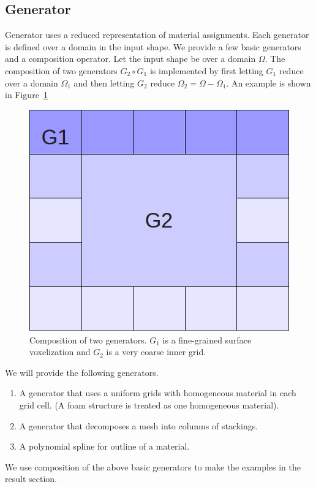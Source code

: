 \documentclass[annual]{acmsiggraph}
\begin{document}
\subsection{Generator}
Generator uses a reduced representation
of material assignments.
Each generator is defined over a domain in the input shape.
We provide a few basic generators and a composition operator.
Let the input shape be over a domain $\Omega$.
The composition of two generators $G_2\circ G_1$ is implemented by
first letting $G_1$ reduce over a domain $\Omega_1$ and
then letting $G_2$ reduce $\Omega_2 = \Omega-\Omega_1$.
An example is shown in Figure~\ref{fig:genCompose}
\begin{figure}[h]
\includegraphics[scale=0.2]{figure/genCompose.png}
\caption{Composition of two generators. $G_1$ is a fine-grained
surface voxelization and $G_2$ is a very coarse inner
grid.}
\label{fig:genCompose}
\end{figure}

We will provide the following generators.
\begin{enumerate}
\item A generator that uses a uniform grids with homogeneous
material in each grid cell. (A foam structure is treated as one homogeneous material).
\item A generator that decomposes a mesh into columns of stackings.
\item A polynomial spline for outline of a material.
\end{enumerate}
We use composition of the above basic generators to make the examples in 
the result section.
\end{document}
